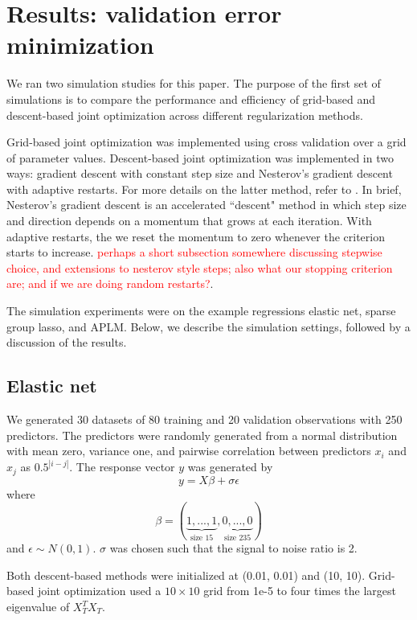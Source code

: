 \documentclass[10pt,letterpaper]{article}
\begin{document}
\section{Results: validation error minimization}

We ran two simulation studies for this paper. The purpose of the first set of simulations is to compare the performance and efficiency of grid-based and descent-based joint optimization across different regularization methods.

Grid-based joint optimization was implemented using cross validation over a grid of parameter values. Descent-based joint optimization was implemented in two ways: gradient descent with constant step size and Nesterov's gradient descent with adaptive restarts. For more details on the latter method, refer to \citet{o2013adaptive}. In brief, Nesterov's gradient descent is an accelerated ``descent" method in which step size and direction depends on a momentum that grows at each iteration. With adaptive restarts, the we reset the momentum to zero whenever the criterion starts to increase. \textcolor{red}{perhaps a short subsection somewhere discussing stepwise choice, and extensions to nesterov style steps; also what our stopping criterion are; and if we are doing random restarts?}. 

The simulation experiments were on the example regressions elastic net, sparse group lasso, and APLM.  Below, we describe the simulation settings, followed by a discussion of the results.

\subsection{Elastic net}
We generated 30 datasets of 80 training and 20 validation observations with 250 predictors. The predictors were randomly generated from a normal distribution with mean zero, variance one, and pairwise correlation between predictors $x_i$ and $x_j$ as $0.5^{|i-j|}$.
The response vector $y$ was generated by
\begin{equation}
y = X\beta + \sigma \epsilon
\end{equation}
where
\begin{equation}
\beta = (\underbrace{1, ..., 1}_\text{size 15}, \underbrace{0, ..., 0}_\text{size 235})
\end{equation}
and $\epsilon \sim N(0, 1)$. $\sigma$ was chosen such that the signal to noise ratio is 2. 

Both descent-based methods were initialized at (0.01, 0.01) and (10, 10). Grid-based joint optimization used a $10 \times 10$ grid from 1e-5 to four times the largest eigenvalue of $X_T^T X_T$.
\end{document}

